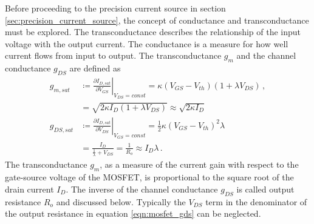 Before proceeding to the precision current source in section \ref{sec:precision_current_source}, the concept of conductance and transconductance must be explored. The transconductance describes the relationship of the input voltage with the output current. The conductance is a measure for how well current flows from input to output. The transconductance $g_m$ and the channel conductance $g_{DS}$ are defined as
\begin{align}
    g_{m, sat} &\coloneqq \left. \frac{\partial I_{D,sat}}{\partial V_{GS}} \right|_{V_{DS} = const} = \kappa \left(V_{GS} - V_{th} \right) (1 + \lambda V_{DS}) \, , \label{eqn:mosfet_gm}\\
    &= \sqrt{2 \kappa I_D \left(1+ \lambda V_{DS}\right)} \approx \sqrt{2 \kappa I_D} \label{eqn:mosfet_gm_approximation} \\
    g_{DS, sat} &\coloneqq \left. \frac{\partial I_{D,sat}}{\partial V_{DS}} \right|_{V_{GS} = const} = \frac{1}{2} \kappa \left(V_{GS} - V_{th} \right)^2 \lambda\\
    &= \frac{I_D}{\frac{1}{\lambda} + V_{DS}} = \frac{1}{R_o} \approx I_D \lambda \label{eqn:mosfet_gds}\,.
\end{align}
The transconductance $g_m$, as a measure of the current gain with respect to the gate-source voltage of the MOSFET, is proportional to the square root of the drain current $I_D$. The inverse of the channel conductance $g_{DS}$ is called output resistance $R_o$ and discussed below. Typically the $V_{DS}$ term in the denominator of the output resistance in equation \ref{eqn:mosfet_gds} can be neglected.

